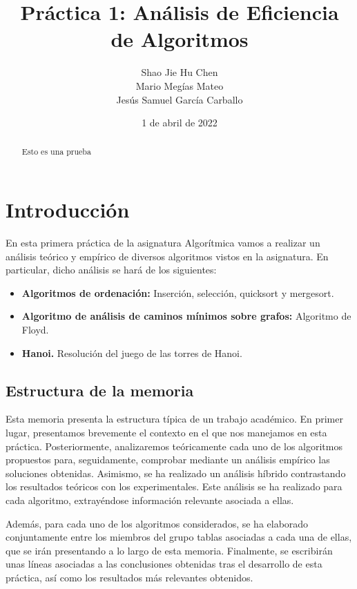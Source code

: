 \documentclass{homework}
\title{Práctica 1: Análisis de Eficiencia de Algoritmos}
\author{Shao Jie Hu Chen \\ Mario Megías Mateo \\ Jesús Samuel García Carballo}
\date{1 de abril de 2022}
\begin{document}
	\maketitle

    \newpage

    \begin{abstract}
		Esto es una prueba
	\end{abstract}
	
    \newpage

	\tableofcontents
	\newpage
	\setcounter{page}{1}
	
	\section{Introducción}

    En esta primera práctica de la asignatura Algorítmica vamos a realizar un análisis teórico y empírico de
    diversos algoritmos vistos en la asignatura. En particular, dicho análisis se hará de los siguientes:

    \begin{itemize}
        \item \textbf{Algoritmos de ordenación:} Inserción, selección, quicksort y mergesort. 
        \item \textbf{Algoritmo de análisis de caminos mínimos sobre grafos:} Algoritmo de Floyd.
        \item \textbf{Hanoi.} Resolución del juego de las torres de Hanoi. 
    \end{itemize}

    \subsection{Estructura de la memoria}
    
	Esta memoria presenta la estructura típica de un trabajo académico. En primer lugar, presentamos
    brevemente el contexto en el que nos manejamos en esta práctica. Posteriormente, analizaremos teóricamente
    cada uno de los algoritmos propuestos para, seguidamente, comprobar mediante un 
    análisis empírico las soluciones obtenidas. Asimismo, se ha realizado un análisis híbrido contrastando
    los resultados teóricos con los experimentales. Este análisis se ha realizado para cada algoritmo, 
    extrayéndose información relevante asociada a ellas. 
    
    Además, para cada uno de los algoritmos considerados, se ha
    elaborado conjuntamente entre los miembros del grupo tablas asociadas a cada una de ellas, que se
    irán presentando a lo largo de esta memoria. Finalmente, se escribirán unas
    líneas asociadas a las conclusiones obtenidas tras el desarrollo de esta práctica, así como los resultados
    más relevantes obtenidos. 
\end{document}
